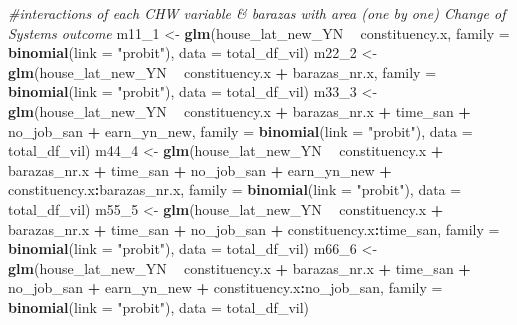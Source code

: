 \documentclass[
]{article}
\newenvironment{Shaded}{\begin{snugshade}}{\end{snugshade}}
\newcommand{\CommentTok}[1]{\textcolor[rgb]{0.56,0.35,0.01}{\textit{#1}}}
\newcommand{\DataTypeTok}[1]{\textcolor[rgb]{0.13,0.29,0.53}{#1}}
\newcommand{\DecValTok}[1]{\textcolor[rgb]{0.00,0.00,0.81}{#1}}
\newcommand{\KeywordTok}[1]{\textcolor[rgb]{0.13,0.29,0.53}{\textbf{#1}}}
\newcommand{\NormalTok}[1]{#1}
\newcommand{\OperatorTok}[1]{\textcolor[rgb]{0.81,0.36,0.00}{\textbf{#1}}}
\newcommand{\StringTok}[1]{\textcolor[rgb]{0.31,0.60,0.02}{#1}}
\begin{document}
\begin{Shaded}
\begin{Highlighting}[]
{{{{{{{{{{{{{{\CommentTok{#interactions of each CHW variable & barazas with area (one by one) Change of Systems outcome}
\NormalTok{m11_}\DecValTok{1}\NormalTok{ <-}\StringTok{ }\KeywordTok{glm}\NormalTok{(house_lat_new_YN }\OperatorTok{~}\StringTok{ }\NormalTok{constituency.x, }\DataTypeTok{family =} \KeywordTok{binomial}\NormalTok{(}\DataTypeTok{link =} \StringTok{"probit"}\NormalTok{), }
             \DataTypeTok{data =}\NormalTok{ total_df_vil)}
\NormalTok{m22_}\DecValTok{2}\NormalTok{ <-}\StringTok{ }\KeywordTok{glm}\NormalTok{(house_lat_new_YN }\OperatorTok{~}\StringTok{ }\NormalTok{constituency.x }\OperatorTok{+}\StringTok{ }\NormalTok{barazas_nr.x, }\DataTypeTok{family =} \KeywordTok{binomial}\NormalTok{(}\DataTypeTok{link =} \StringTok{"probit"}\NormalTok{), }
             \DataTypeTok{data =}\NormalTok{ total_df_vil)}
\NormalTok{m33_}\DecValTok{3}\NormalTok{ <-}\StringTok{ }\KeywordTok{glm}\NormalTok{(house_lat_new_YN }\OperatorTok{~}\StringTok{ }\NormalTok{constituency.x }\OperatorTok{+}\StringTok{ }\NormalTok{barazas_nr.x }\OperatorTok{+}\StringTok{ }\NormalTok{time_san }\OperatorTok{+}\StringTok{ }\NormalTok{no_job_san }\OperatorTok{+}\StringTok{ }\NormalTok{earn_yn_new, }\DataTypeTok{family =} \KeywordTok{binomial}\NormalTok{(}\DataTypeTok{link =} \StringTok{"probit"}\NormalTok{), }
             \DataTypeTok{data =}\NormalTok{ total_df_vil)}
\NormalTok{m44_}\DecValTok{4}\NormalTok{ <-}\StringTok{ }\KeywordTok{glm}\NormalTok{(house_lat_new_YN }\OperatorTok{~}\StringTok{ }\NormalTok{constituency.x }\OperatorTok{+}\StringTok{ }\NormalTok{barazas_nr.x }\OperatorTok{+}\StringTok{ }\NormalTok{time_san }\OperatorTok{+}\StringTok{ }\NormalTok{no_job_san }\OperatorTok{+}\StringTok{ }\NormalTok{earn_yn_new }\OperatorTok{+}\StringTok{ }\NormalTok{constituency.x}\OperatorTok{:}\NormalTok{barazas_nr.x, }\DataTypeTok{family =} \KeywordTok{binomial}\NormalTok{(}\DataTypeTok{link =} \StringTok{"probit"}\NormalTok{), }\DataTypeTok{data =}\NormalTok{ total_df_vil)}
\NormalTok{m55_}\DecValTok{5}\NormalTok{ <-}\StringTok{ }\KeywordTok{glm}\NormalTok{(house_lat_new_YN }\OperatorTok{~}\StringTok{ }\NormalTok{constituency.x }\OperatorTok{+}\StringTok{ }\NormalTok{barazas_nr.x }\OperatorTok{+}\StringTok{ }\NormalTok{time_san }\OperatorTok{+}\StringTok{ }\NormalTok{no_job_san }\OperatorTok{+}\StringTok{ }\NormalTok{constituency.x}\OperatorTok{:}\NormalTok{time_san, }\DataTypeTok{family =} \KeywordTok{binomial}\NormalTok{(}\DataTypeTok{link =} \StringTok{"probit"}\NormalTok{), }\DataTypeTok{data =}\NormalTok{ total_df_vil)}
\NormalTok{m66_}\DecValTok{6}\NormalTok{ <-}\StringTok{ }\KeywordTok{glm}\NormalTok{(house_lat_new_YN }\OperatorTok{~}\StringTok{ }\NormalTok{constituency.x }\OperatorTok{+}\StringTok{ }\NormalTok{barazas_nr.x }\OperatorTok{+}\StringTok{ }\NormalTok{time_san }\OperatorTok{+}\StringTok{ }\NormalTok{no_job_san }\OperatorTok{+}\StringTok{ }\NormalTok{earn_yn_new }\OperatorTok{+}\StringTok{ }\NormalTok{constituency.x}\OperatorTok{:}\NormalTok{no_job_san, }\DataTypeTok{family =} \KeywordTok{binomial}\NormalTok{(}\DataTypeTok{link =} \StringTok{"probit"}\NormalTok{), }\DataTypeTok{data =}\NormalTok{ total_df_vil)}
}}}}}}}}}}}}}}
\end{Highlighting}
\end{Shaded}
\end{document}
